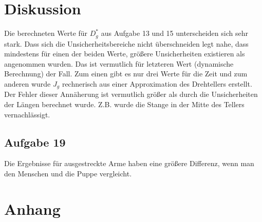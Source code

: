 \documentclass[a4paper, 11pt, ngerman]{scrartcl}
\begin{document}
\section{Diskussion}
Die berechneten Werte für $D^*_g$ aus Aufgabe 13 und 15 unterscheiden sich sehr stark. Dass sich die Unsicherheitsbereiche nicht überschneiden legt nahe, dass mindestens für einen der beiden Werte, größere Unsicherheiten existieren als angenommen wurden. Das ist vermutlich für letzteren Wert (dynamische Berechnung) der Fall. Zum einen gibt es nur drei Werte für die Zeit und zum anderen wurde $J_g$ rechnerisch aus einer Approximation des Drehtellers erstellt. Der Fehler dieser Annäherung ist vermutlich größer als durch die Unsicherheiten der Längen berechnet wurde. Z.B. wurde die Stange in der Mitte des Tellers vernachlässigt.

\subsection{Aufgabe 19}
Die Ergebnisse für ausgestreckte Arme haben eine größere Differenz, wenn man den Menschen und die Puppe vergleicht.



\section{Anhang}
\end{document}
